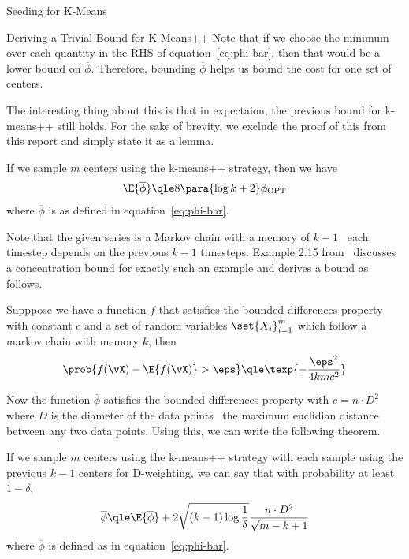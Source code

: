 \documentclass[10pt]{article}
\newcommand{\opt}[1]{#1_{\text{OPT}}}
\begin{document}
\begin{psection}{Seeding for K-Means}
\begin{psubsection}{Deriving a Trivial Bound for K-Means++}
        Note that if we choose the minimum over each quantity in the RHS of
        equation~\ref{eq:phi-bar}, then that would be a lower bound on
        $\overline{\phi}$. Therefore, bounding $\overline{\phi}$ helps us bound the
        cost for one set of centers.

        The interesting thing about this is that in expectaion, the previous bound
        for k-means++ still holds. For the sake of brevity, we exclude the proof of
        this from this report and simply state it as a lemma.
        \begin{lemma}
            If we sample $m$ centers using the k-means++ strategy, then we have
            \begin{align*}
                \E{\overline{\phi}} \qle 8 \para{\log k + 2} \opt{\phi}
            \end{align*}
            where $\overline{\phi}$ is as defined in equation~\ref{eq:phi-bar}.
        \end{lemma}

        Note that the given series is a Markov chain with a memory of $k-1$ \ie\
        each timestep depends on the previous $k-1$ timesteps. Example 2.15
        from~\cite{paulin} discusses a concentration bound for exactly such an
        example and derives a bound as follows.

        Supppose we have a function $f$ that satisfies the bounded differences
        property with constant $c$ and a set of random variables $\set{X_i}_{i=1}^m$
        which follow a markov chain with memory $k$, then
        \begin{align*}
            \prob{f(\vX) - \E{f(\vX)} > \eps} \qle \texp{-\frac{\eps^2}{4kmc^2}}
        \end{align*}

        Now the function $\overline{\phi}$ satisfies the bounded differences
        property with $c = n \cdot D^2$ where $D$ is the diameter of the data points
        \ie\ the maximum euclidian distance between any two data points. Using this,
        we can write the following theorem.

        \begin{theorem}%
            If we sample $m$ centers using the k-means++ strategy with each sample
            using the previous $k-1$ centers for D\sups{2}-weighting, we can say
            that with probability at least $1 - \delta$,
            \begin{align*}
                \overline{\phi} \qle \E{\overline{\phi}} + 2 \sqrt{(k - 1) \log{\frac{1}{\delta}}} \frac{n \cdot D^2}{\sqrt{m - k + 1}}
            \end{align*}
            where $\overline{\phi}$ is defined as in equation~\ref{eq:phi-bar}.
        \end{theorem}


\end{psubsection}
\end{psection}
\end{document}
